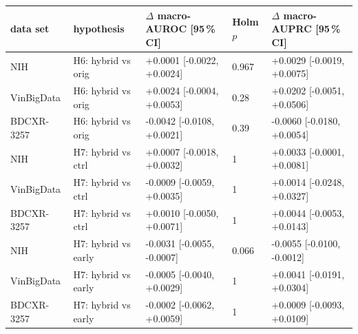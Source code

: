\begin{tabular}{lllll}
\toprule
data set & hypothesis & $\Delta$ macro-AUROC [95\,\% CI] & Holm $p$ & $\Delta$ macro-AUPRC [95\,\% CI] \\
\midrule
NIH & H6: hybrid vs orig & +0.0001 [-0.0022, +0.0024] & 0.967 & +0.0029 [-0.0019, +0.0075] \\
VinBigData & H6: hybrid vs orig & +0.0024 [-0.0004, +0.0053] & 0.28 & +0.0202 [-0.0051, +0.0506] \\
BDCXR-3257 & H6: hybrid vs orig & -0.0042 [-0.0108, +0.0021] & 0.39 & -0.0060 [-0.0180, +0.0054] \\
NIH & H7: hybrid vs ctrl & +0.0007 [-0.0018, +0.0032] & 1 & +0.0033 [-0.0001, +0.0081] \\
VinBigData & H7: hybrid vs ctrl & -0.0009 [-0.0059, +0.0035] & 1 & +0.0014 [-0.0248, +0.0327] \\
BDCXR-3257 & H7: hybrid vs ctrl & +0.0010 [-0.0050, +0.0071] & 1 & +0.0044 [-0.0053, +0.0143] \\
NIH & H7: hybrid vs early & -0.0031 [-0.0055, -0.0007] & 0.066 & -0.0055 [-0.0100, -0.0012] \\
VinBigData & H7: hybrid vs early & -0.0005 [-0.0040, +0.0029] & 1 & +0.0041 [-0.0191, +0.0304] \\
BDCXR-3257 & H7: hybrid vs early & -0.0002 [-0.0062, +0.0059] & 1 & +0.0009 [-0.0093, +0.0109] \\
\bottomrule
\end{tabular}
